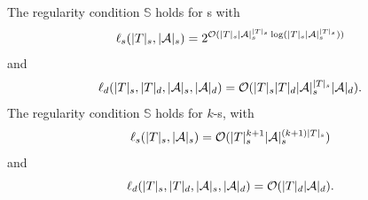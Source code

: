 \begin{lemma}\label{lem-spt}
The regularity condition $\mathbb{S}$\prerec{} holds for \SSPT{}s with 
$$\ell_s(|T|_s, |\mathcal{A}|_s) = 2^{\mathcal{O}( |T|_s |\mathcal{A}|_s^{|T|_s} \log (|T|_s |\mathcal{A}|_s^{|T|_s}))}$$ 
and  
$$\ell_d(|T|_s, |T|_d, |\mathcal{A}|_s, |\mathcal{A}|_d) = \mathcal{O}(|T|_s  |T|_d |\mathcal{A}|_s^{|T|_s} |\mathcal{A}|_d).$$ 
%
The regularity condition $\mathbb{S}$\prerec{} holds for $k$-\RBSSPT{}s, with 
$$\ell_s(|T|_s, |\mathcal{A}|_s) =\mathcal{O}( |T|_s^{k+1} |\mathcal{A}|_s^{(k+1)|T|_s})$$ 
and  
$$\ell_d(|T|_s, |T|_d, |\mathcal{A}|_s, |\mathcal{A}|_d) = \mathcal{O}(|T|_d |\mathcal{A}|_d).$$
%
\end{lemma}


